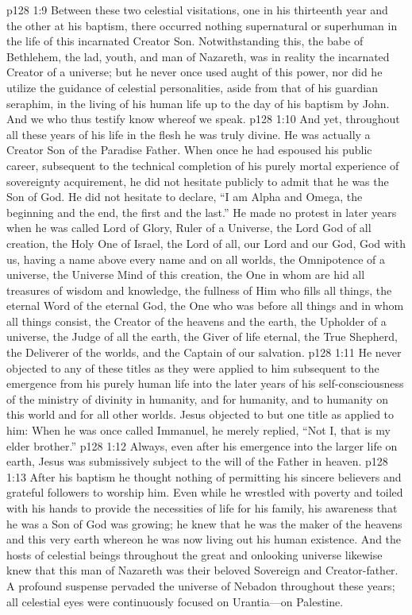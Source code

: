 \vs p128 1:9 Between these two celestial visitations, one in his thirteenth year and the other at his baptism, there occurred nothing supernatural or superhuman in the life of this incarnated Creator Son. Notwithstanding this, the babe of Bethlehem, the lad, youth, and man of Nazareth, was in reality the incarnated Creator of a universe; but he never once used aught of this power, nor did he utilize the guidance of celestial personalities, aside from that of his guardian seraphim, in the living of his human life up to the day of his baptism by John. And we who thus testify know whereof we speak.\plusone
\vs p128 1:10 And yet, throughout all these years of his life in the flesh he was truly divine. He was actually a Creator Son of the Paradise Father. When once he had espoused his public career, subsequent to the technical completion of his purely mortal experience of sovereignty acquirement, he did not hesitate publicly to admit that he was the Son of God. He did not hesitate to declare, \textcolor{ubdarkred}{“I am Alpha and Omega, the beginning and the end, the first and the last.”} He made no protest in later years when he was called Lord of Glory, Ruler of a Universe, the Lord God of all creation, the Holy One of Israel, the Lord of all, our Lord and our God, God with us, having a name above every name and on all worlds, the Omnipotence of a universe, the Universe Mind of this creation, the One in whom are hid all treasures of wisdom and knowledge, the fullness of Him who fills all things, the eternal Word of the eternal God, the One who was before all things and in whom all things consist, the Creator of the heavens and the earth, the Upholder of a universe, the Judge of all the earth, the Giver of life eternal, the True Shepherd, the Deliverer of the worlds, and the Captain of our salvation.
\pc \vs p128 1:11 He never objected to any of these titles as they were applied to him subsequent to the emergence from his purely human life into the later years of his self\hyp{}consciousness of the ministry of divinity in humanity, and for humanity, and to humanity on this world and for all other worlds. Jesus objected to but one title as applied to him: When he was once called Immanuel, he merely replied, \textcolor{ubdarkred}{“Not I, that is my elder brother.”}
\vs p128 1:12 Always, even after his emergence into the larger life on earth, Jesus was submissively subject to the will of the Father in heaven.
\vs p128 1:13 After his baptism he thought nothing of permitting his sincere believers and grateful followers to worship him. Even while he wrestled with poverty and toiled with his hands to provide the necessities of life for his family, his awareness that he was a Son of God was growing; he knew that he was the maker of the heavens and this very earth whereon he was now living out his human existence. And the hosts of celestial beings throughout the great and onlooking universe likewise knew that this man of Nazareth was their beloved Sovereign and Creator\hyp{}father. A profound suspense pervaded the universe of Nebadon throughout these years; all celestial eyes were continuously focused on Urantia---on Palestine.
